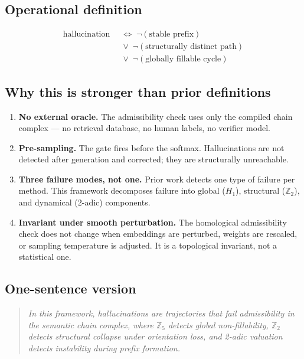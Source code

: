 \documentclass[11pt,a4paper]{article}
\begin{document}
\subsection*{Operational definition}
\begin{equation*}
\boxed{
\begin{aligned}
\mathrm{hallucination}\;&\;\Longleftrightarrow\;
\neg(\text{stable prefix})\\
&\;\vee\;\neg(\text{structurally distinct path})\\
&\;\vee\;\neg(\text{globally fillable cycle})
\end{aligned}
}
\end{equation*}

\subsection*{Why this is stronger than prior definitions}

\begin{enumerate}
  \item \textbf{No external oracle.}
    The admissibility check uses only the compiled chain complex ---
    no retrieval database, no human labels, no verifier model.
  \item \textbf{Pre-sampling.}
    The gate fires before the softmax.
    Hallucinations are not detected after generation and corrected;
    they are structurally unreachable.
  \item \textbf{Three failure modes, not one.}
    Prior work detects one type of failure per method.
    This framework decomposes failure into global ($H_1$),
    structural ($\mathbb{Z}_2$), and dynamical (2-adic) components.
  \item \textbf{Invariant under smooth perturbation.}
    The homological admissibility check does not change when
    embeddings are perturbed, weights are rescaled, or
    sampling temperature is adjusted.
    It is a topological invariant, not a statistical one.
\end{enumerate}

\subsection*{One-sentence version}
\begin{quote}
\emph{In this framework, hallucinations are trajectories that fail
admissibility in the semantic chain complex, where $\mathbb{Z}_5$
detects global non-fillability, $\mathbb{Z}_2$ detects structural
collapse under orientation loss, and 2-adic valuation detects
instability during prefix formation.}
\end{quote}
\end{document}
